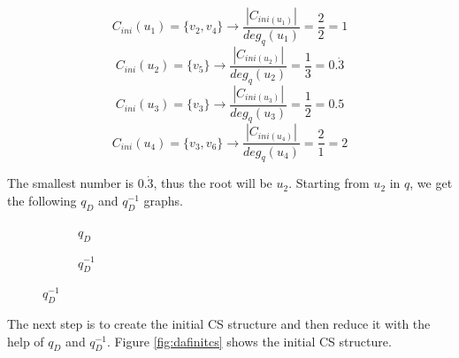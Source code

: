 \begin{example}
    \[
        C_{ini}(u_1) = \{v_2, v_4\} \rightarrow \frac{|C_{ini(u_1)}|}{deg_q(u_1)} = \frac{2}{2} = 1
    \]
    \[
        C_{ini}(u_2) = \{v_5\} \rightarrow \frac{|C_{ini(u_2)}|}{deg_q(u_2)} = \frac{1}{3} = 0.\dot{3}
    \]
    \[
        C_{ini}(u_3) = \{v_3\} \rightarrow \frac{|C_{ini(u_3)}|}{deg_q(u_3)} = \frac{1}{2} = 0.5
    \]
    \[
        C_{ini}(u_4) = \{v_3,v_6\} \rightarrow \frac{|C_{ini(u_4)}|}{deg_q(u_4)} = \frac{2}{1} = 2
    \]

    The smallest number is $0.\dot{3}$, thus the root will be $u_2$. Starting from $u_2$ in $q$, we get
    the following $q_D$ and $q^{-1}_D$ graphs.

    \begin{figure}[h!]
        \centering
        \begin{subfigure}{.4\textwidth}
            \centering
          \caption{$q_D$}
        \end{subfigure}
        \begin{subfigure}{.4\textwidth}
            \centering
          \caption{$q^{-1}_D$}
        \end{subfigure}        
        \label{fig:dafqd}
    \end{figure}

    The next step is to create the initial CS structure and then reduce it with the help of $q_D$ and $q^{-1}_D$.
    Figure \ref{fig:dafinitcs} shows the initial CS structure.


\end{example}
